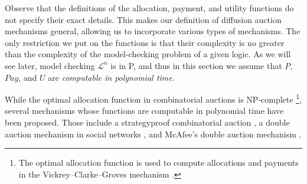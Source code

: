 \documentclass[letterpaper]{article} %
\theoremstyle{definition}
\newcommand{\Pay}{\mathit{Pay}}
\begin{document}
Observe that the definitions of the allocation, payment, and utility functions do not specify their exact details. This makes our definition of diffusion auction mechanisms general, allowing us to incorporate various types of mechanisms. The only restriction we put on the functions is that their complexity is no greater than the complexity of the model-checking problem of a given logic. As we will see later, model checking $\mathcal{L}^n$ is in P, and thus in this section we assume that $P$, $\Pay$, and $U$ are \emph{computable in polynomial time}. %

While the optimal allocation function in combinatorial auctions is NP-complete %
\cite{Nisan2007}\footnote{The optimal allocation function is used to compute allocations and payments
in the Vickrey–Clarke–Groves mechanism \cite{vickrey1961counterspeculation,clarke1971multipart,groves1973incentives}.  
}, several mechanisms whose functions are computable in polynomial time have been proposed. Those include a strategyproof combinatorial auction \cite{dobzinski2012computational}, a double auction mechanism in social networks \cite{xu2020design}, and  McAfee's double auction mechanism \cite{mcafee1992dominant}. %
\end{document}
